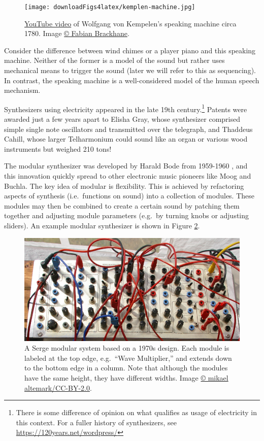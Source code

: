 \documentclass[
]{book}
\begin{document}
\begin{figure}
\centering
\texttt{[image: downloadFigs4latex/kemplen-machine.jpg]}
\caption{\label{fig:kemplen-machine}\href{https://youtu.be/k_YUB_S6Gpo?start=21}{YouTube video} of Wolfgang von Kempelen's speaking machine circa 1780. Image \href{https://www.youtube.com/user/Quintatoen}{© Fabian Brackhane}.}
\end{figure}

Consider the difference between wind chimes or a player piano and this speaking machine.
Neither of the former is a model of the sound but rather uses mechanical means to trigger the sound (later we will refer to this as sequencing).
In contrast, the speaking machine is a well-considered model of the human speech mechanism.

Synthesizers using electricity appeared in the late 19th century.\footnote{There is some difference of opinion on what qualifies as usage of electricity in this context. For a fuller history of synthesizers, see \url{https://120years.net/wordpress/}}
Patents were awarded just a few years apart to Elisha Gray, whose synthesizer comprised simple single note oscillators and transmitted over the telegraph, and Thaddeus Cahill, whose larger Telharmonium could sound like an organ or various wood instruments but weighed 210 tons!

The modular synthesizer was developed by Harald Bode from 1959-1960 \citep{Bode1984}, and this innovation quickly spread to other electronic music pioneers like Moog and Buchla.
The key idea of modular is flexibility.
This is achieved by refactoring aspects of synthesis (i.e.~functions on sound) into a collection of modules.
These modules may then be combined to create a certain sound by patching them together and adjusting module parameters (e.g.~by turning knobs or adjusting sliders).
An example modular synthesizer is shown in Figure \ref{fig:serge-modular}.



\begin{figure}
\includegraphics[width=1\linewidth]{images/Serge_Modular,_Norbergfestival_2007_cropped} \caption{A Serge modular system based on a 1970s design. Each module is labeled at the top edge, e.g.~``Wave Multiplier,'' and extends down to the bottom edge in a column. Note that although the modules have the same height, they have different widths. Image \href{https://commons.wikimedia.org/wiki/File:Serge_Modular,_Norbergfestival_2007.jpg}{© mikael altemark/CC-BY-2.0}.}\label{fig:serge-modular}
\end{figure}
\end{document}
